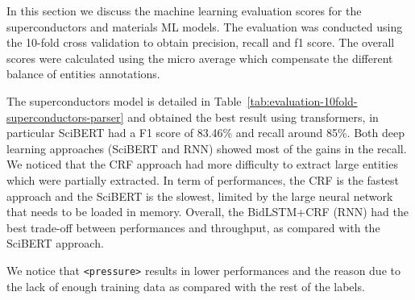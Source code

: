 \documentclass{article}
\begin{document}
In this section we discuss the machine learning evaluation scores for the superconductors and materials ML models. The evaluation was conducted using the 10-fold cross validation to obtain precision, recall and f1 score. The overall scores were calculated using the micro average which compensate the different balance of entities annotations. 

The superconductors model is detailed in Table~\ref{tab:evaluation-10fold-superconductors-parser} and obtained the best result using transformers, in particular SciBERT had a F1 score of 83.46\% and recall around 85\%. Both deep learning approaches (SciBERT and RNN) showed most of the gains in the recall.
We noticed that the CRF approach had more difficulty to extract large entities which were partially extracted. 
In term of performances, the CRF is the fastest approach and the SciBERT is the slowest, limited by the large neural network that needs to be loaded in memory.
Overall, the BidLSTM+CRF (RNN) had the best trade-off between performances and throughput, as compared with the SciBERT approach. 

We notice that \texttt{<pressure>} results in lower performances and the reason due to the lack of enough training data as compared with the rest of the labels. 

\begin{table}[ht]
\centering\small
{}
\caption{\label{tab:evaluation-10fold-superconductors-parser} Evaluation scores for the superconductor models using 10-fold cross-validation. }
\end{table}
\end{document}

